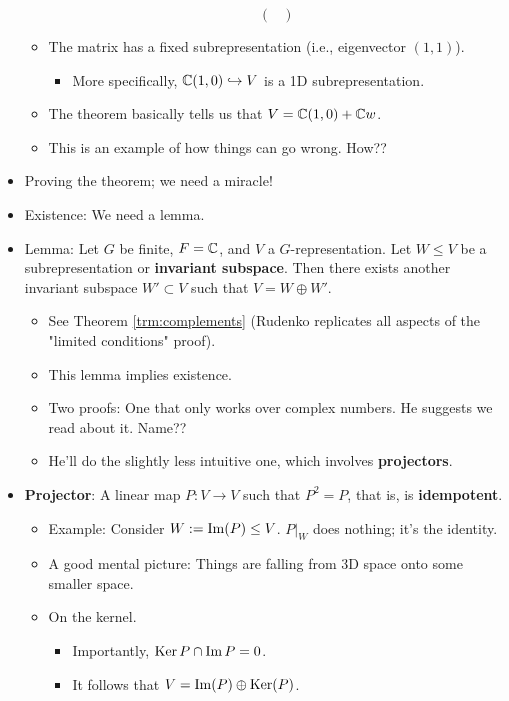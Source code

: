 \documentclass[../notes.tex]{subfiles}
\begin{document}
\begin{itemize}
\begin{itemize}
\begin{equation*}
\begin{pmatrix}
            \end{pmatrix}
        \end{equation*}
        \item The matrix has a fixed subrepresentation (i.e., eigenvector $(1,1)$).
        \begin{itemize}
            \item More specifically, $\mathbb{C}(1,0)\hookrightarrow V$ is a 1D subrepresentation.
        \end{itemize}
        \item The theorem basically tells us that $V=\mathbb{C}(1,0)+\mathbb{C} w$.
        \item This is an example of how things can go wrong. How??
    \end{itemize}
    \item Proving the theorem; we need a miracle!
    \item Existence: We need a lemma.
    \item Lemma: Let $G$ be finite, $F=\mathbb{C}$, and $V$ a $G$-representation. Let $W\leq V$ be a subrepresentation or \textbf{invariant subspace}. Then there exists another invariant subspace $W'\subset V$ such that $V=W\oplus W'$.
    \begin{itemize}
        \item See Theorem \ref{trm:complements} (Rudenko replicates all aspects of the "limited conditions" proof).
        \item This lemma implies existence.
        \item Two proofs: One that only works over complex numbers. He suggests we read about it. Name??
        \item He'll do the slightly less intuitive one, which involves \textbf{projectors}.
    \end{itemize}
    \item \textbf{Projector}: A linear map $P:V\to V$ such that $P^2=P$, that is, is \textbf{idempotent}.
    \begin{itemize}
        \item Example: Consider $W:=\operatorname{Im}(P)\leq V$. $P|_W$ does nothing; it's the identity.
        \item A good mental picture: Things are falling from 3D space onto some smaller space.
        \item On the kernel.
        \begin{itemize}
            \item Importantly, $\operatorname{Ker} P\cap\operatorname{Im} P=0$.
            \item It follows that $V=\operatorname{Im}(P)\oplus\operatorname{Ker}(P)$.

\end{itemize}
\end{itemize}
\end{itemize}
\end{document}
